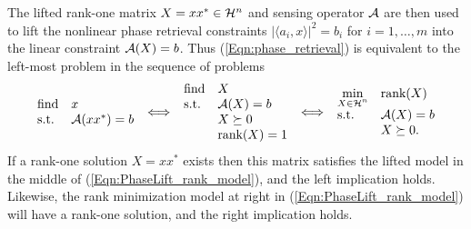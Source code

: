 The lifted rank-one matrix $X = xx^* \in {\mathcal H}^n$ and sensing operator ${\mathcal A}$ are then used to lift the nonlinear phase retrieval constraints $| \langle a_i, x \rangle | ^2 = b_i$ for $i = 1, \ldots, m$ into the linear constraint ${\mathcal A}(X) = b$.  Thus (\ref{Eqn:phase_retrieval}) is equivalent to the left-most problem in the sequence of problems
\begin{equation} 		\label{Eqn:PhaseLift_rank_model}
\begin{array}{ll}
		\textnormal{find}
		&	x
			\\
		\textnormal{s.t.}
		& 	{\mathcal A} (xx^*) = b
\end{array}
\iff
\begin{array}{ll}
		\textnormal{find}
		&	X
			\\
		\textnormal{s.t.}
		& 	{\mathcal A} (X) = b
			\\
		&	X \succeq 0
			\\
		&	\textnormal{rank}(X) = 1
\end{array}
\iff
\begin{array}{ll}
		\min\limits_{\substack{X \in {\mathcal H}^n}}
		&	\textnormal{rank}(X)
			\\
		\textnormal{s.t.}
		& 	{\mathcal A} (X) = b
			\\
		&	X \succeq 0.
\end{array}
\end{equation}
If a rank-one solution  $X = xx^*$ exists then this matrix satisfies the lifted model in the middle of (\ref{Eqn:PhaseLift_rank_model}), and the left implication holds.  Likewise, the rank minimization model at right in (\ref{Eqn:PhaseLift_rank_model}) will have a rank-one solution, and the right implication holds.  





